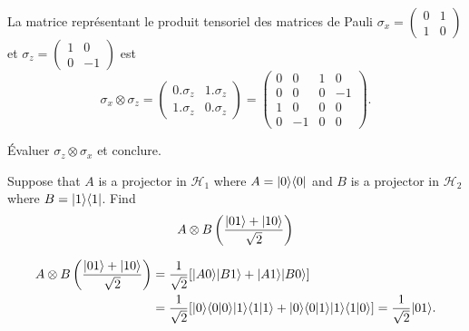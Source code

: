 \begin{example}
La matrice représentant le produit tensoriel des matrices de Pauli $\sigma
_{x}=\begin{pmatrix}
0 & 1\\
1 & 0
\end{pmatrix}$ et $\sigma_{z}=\begin{pmatrix}
1 & 0\\
0 & -1
\end{pmatrix}$ est%
\begin{equation}
\sigma_{x}\otimes\sigma_{z}=\begin{pmatrix}
0.\sigma_{z} & 1.\sigma_{z}\\
1.\sigma_{z} & 0.\sigma_{z}
\end{pmatrix}
=\begin{pmatrix}
0 & 0 & 1 & 0\\
0 & 0 & 0 & -1\\
1 & 0 & 0 & 0\\
0 & -1 & 0 & 0
\end{pmatrix}.
\end{equation}

\end{example}

\begin{exercise}
 Évaluer $\sigma_{z}\otimes\sigma_{x}$ et conclure.
\end{exercise}
\begin{exercise}
 Suppose that $A$ is a projector in $\mathcal{H}_{1}$ where $A=\vert0\rangle\langle0\vert$
and $B$ is a projector in $\mathcal{H}_{2}$ where $B=\vert1\rangle\langle1\vert$. Find
\begin{equation}
 A\otimes B\left( \frac{\vert01\rangle+\vert10\rangle}{\sqrt{2}}\right)
\end{equation}
\end{exercise}
\begin{footnotesize}
\begin{solution}
\begin{equation}
 \begin{split}
A\otimes B\left( \frac{\vert01\rangle+\vert10\rangle}{\sqrt{2}}\right) & =
\frac{1}{\sqrt{2}}[\vert A0\rangle\vert B1\rangle+\vert A1\rangle\vert B0\rangle]\\
& =\frac{1}{\sqrt{2}}[\vert0\rangle\langle0\vert0\rangle\vert1\rangle\langle1\vert1\rangle+\vert0\rangle\langle0\vert1\rangle\vert1\rangle\langle1\vert0\rangle]=\frac{1}{\sqrt{2}}\vert01\rangle.
\end{split}
\end{equation}
\end{solution}
\end{footnotesize}


